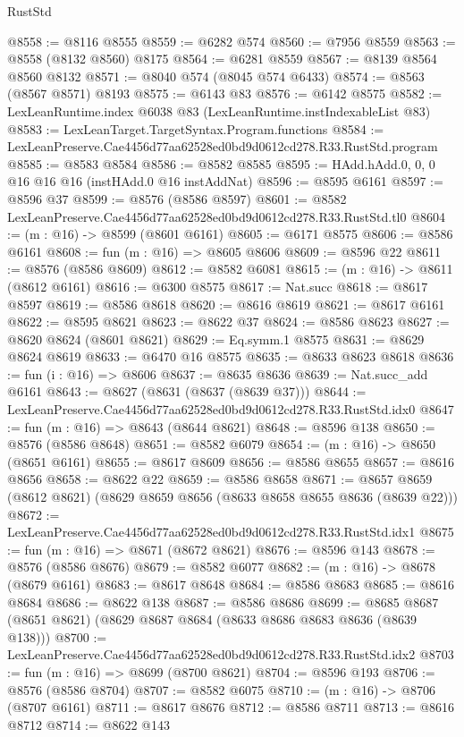 \begin{lexlean}{RustStd}
\begin{coremodule}
@8558 := @8116 @8555
@8559 := @6282 @574
@8560 := @7956 @8559
@8563 := @8558 (@8132 @8560) @8175
@8564 := @6281 @8559
@8567 := @8139 @8564 @8560 @8132
@8571 := @8040 @574 (@8045 @574 @6433)
@8574 := @8563 (@8567 @8571) @8193
@8575 := @6143 @83
@8576 := @6142 @8575
@8582 := LexLeanRuntime.index @6038 @83 (LexLeanRuntime.instIndexableList @83)
@8583 := LexLeanTarget.TargetSyntax.Program.functions
@8584 := LexLeanPreserve.Cae4456d77aa62528ed0bd9d0612cd278.R33.RustStd.program
@8585 := @8583 @8584
@8586 := @8582 @8585
@8595 := HAdd.hAdd.{0, 0, 0} @16 @16 @16 (instHAdd.{0} @16 instAddNat)
@8596 := @8595 @6161
@8597 := @8596 @37
@8599 := @8576 (@8586 @8597)
@8601 := @8582 LexLeanPreserve.Cae4456d77aa62528ed0bd9d0612cd278.R33.RustStd.tl0
@8604 := (m : @16) -> @8599 (@8601 @6161)
@8605 := @6171 @8575
@8606 := @8586 @6161
@8608 := fun (m : @16) => @8605 @8606
@8609 := @8596 @22
@8611 := @8576 (@8586 @8609)
@8612 := @8582 @6081
@8615 := (m : @16) -> @8611 (@8612 @6161)
@8616 := @6300 @8575
@8617 := Nat.succ
@8618 := @8617 @8597
@8619 := @8586 @8618
@8620 := @8616 @8619
@8621 := @8617 @6161
@8622 := @8595 @8621
@8623 := @8622 @37
@8624 := @8586 @8623
@8627 := @8620 @8624 (@8601 @8621)
@8629 := Eq.symm.{1} @8575
@8631 := @8629 @8624 @8619
@8633 := @6470 @16 @8575
@8635 := @8633 @8623 @8618
@8636 := fun (i : @16) => @8606
@8637 := @8635 @8636
@8639 := Nat.succ_add @6161
@8643 := @8627 (@8631 (@8637 (@8639 @37)))
@8644 := LexLeanPreserve.Cae4456d77aa62528ed0bd9d0612cd278.R33.RustStd.idx0
@8647 := fun (m : @16) => @8643 (@8644 @8621)
@8648 := @8596 @138
@8650 := @8576 (@8586 @8648)
@8651 := @8582 @6079
@8654 := (m : @16) -> @8650 (@8651 @6161)
@8655 := @8617 @8609
@8656 := @8586 @8655
@8657 := @8616 @8656
@8658 := @8622 @22
@8659 := @8586 @8658
@8671 := @8657 @8659 (@8612 @8621) (@8629 @8659 @8656 (@8633 @8658 @8655 @8636 (@8639 @22)))
@8672 := LexLeanPreserve.Cae4456d77aa62528ed0bd9d0612cd278.R33.RustStd.idx1
@8675 := fun (m : @16) => @8671 (@8672 @8621)
@8676 := @8596 @143
@8678 := @8576 (@8586 @8676)
@8679 := @8582 @6077
@8682 := (m : @16) -> @8678 (@8679 @6161)
@8683 := @8617 @8648
@8684 := @8586 @8683
@8685 := @8616 @8684
@8686 := @8622 @138
@8687 := @8586 @8686
@8699 := @8685 @8687 (@8651 @8621) (@8629 @8687 @8684 (@8633 @8686 @8683 @8636 (@8639 @138)))
@8700 := LexLeanPreserve.Cae4456d77aa62528ed0bd9d0612cd278.R33.RustStd.idx2
@8703 := fun (m : @16) => @8699 (@8700 @8621)
@8704 := @8596 @193
@8706 := @8576 (@8586 @8704)
@8707 := @8582 @6075
@8710 := (m : @16) -> @8706 (@8707 @6161)
@8711 := @8617 @8676
@8712 := @8586 @8711
@8713 := @8616 @8712
@8714 := @8622 @143

\end{coremodule}
\end{lexlean}
